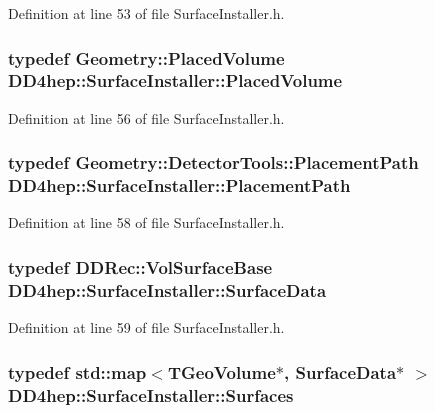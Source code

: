 Definition at line 53 of file SurfaceInstaller.h.\hypertarget{class_d_d4hep_1_1_surface_installer_a48fe5565640dc158344c63c2fbb9c506}{
\subsubsection[{PlacedVolume}]{\setlength{\rightskip}{0pt plus 5cm}typedef {\bf Geometry::PlacedVolume} {\bf DD4hep::SurfaceInstaller::PlacedVolume}}}
\label{class_d_d4hep_1_1_surface_installer_a48fe5565640dc158344c63c2fbb9c506}


Definition at line 56 of file SurfaceInstaller.h.\hypertarget{class_d_d4hep_1_1_surface_installer_a73ea611f3129bed899d4282cd126c4e5}{
\subsubsection[{PlacementPath}]{\setlength{\rightskip}{0pt plus 5cm}typedef {\bf Geometry::DetectorTools::PlacementPath} {\bf DD4hep::SurfaceInstaller::PlacementPath}}}
\label{class_d_d4hep_1_1_surface_installer_a73ea611f3129bed899d4282cd126c4e5}


Definition at line 58 of file SurfaceInstaller.h.\hypertarget{class_d_d4hep_1_1_surface_installer_adf9b9c7ac69d57dd6e262891e925be3c}{
\subsubsection[{SurfaceData}]{\setlength{\rightskip}{0pt plus 5cm}typedef {\bf DDRec::VolSurfaceBase} {\bf DD4hep::SurfaceInstaller::SurfaceData}}}
\label{class_d_d4hep_1_1_surface_installer_adf9b9c7ac69d57dd6e262891e925be3c}


Definition at line 59 of file SurfaceInstaller.h.\hypertarget{class_d_d4hep_1_1_surface_installer_a16346209b86955ff4a4a380c3ce1bcd2}{
\subsubsection[{Surfaces}]{\setlength{\rightskip}{0pt plus 5cm}typedef std::map$<$TGeoVolume$\ast$, {\bf SurfaceData}$\ast$ $>$ {\bf DD4hep::SurfaceInstaller::Surfaces}}}
\label{class_d_d4hep_1_1_surface_installer_a16346209b86955ff4a4a380c3ce1bcd2}


